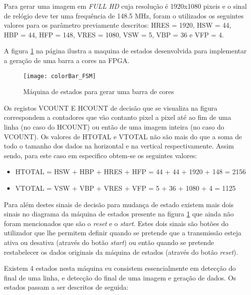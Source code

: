 Para gerar uma imagem em \textit{FULL HD} cuja resolução é 1920x1080 pixeis e o sinal de relógio deve ter uma frequência de 148.5 MHz, foram o utilizados os seguintes valores para os parâmetro previamente descritos: HRES = 1920, HSW = 44, HBP = 44, HFP = 148,  VRES = 1080, VSW = 5, VBP = 36 e VFP = 4.

A figura \ref{fig:colorBar_fsm} na página \pageref{fig:colorBar_fsm} ilustra a maquina de estados desenvolvida para implementar a geração de uma barra a cores na FPGA. 

\begin{figure}[h!]
	\begin{center}
		\leavevmode
		\texttt{[image: colorBar\_FSM]}
		\caption{Máquina de estados para gerar uma barra de cores}
		\label{fig:colorBar_fsm}
	\end{center}
\end{figure}

Os registos VCOUNT E HCOUNT de decisão que se visualiza na figura correspondem a contadores que vão contanto pixel a pixel até ao fim de uma linha (no caso do HCOUNT) ou então de uma imagem inteira (no caso do VCOUNT). Os valores de HTOTAL e VTOTAL não são mais do que a soma de todo o tamanho dos dados na horizontal e na vertical respectivamente. Assim sendo, para este caso em especifico obtem-se os seguintes valores:
\begin{itemize}
	\item HTOTAL = HSW + HBP + HRES + HFP = 44 + 44 + 1920 + 148 = 2156
	\item VTOTAL = VSW + VBP + VRES + VFP = 5 + 36 + 1080 + 4 = 1125
\end{itemize}

Para além destes sinais de decisão para mudança de estado existem mais dois sinais no diagrama da máquina de estados presente na figura \ref{fig:colorBar_fsm} que ainda não foram mencionados que são o \textit{reset} e o \textit{start}. Estes dois sinais são botões do utilizador que lhe permitem definir quando se pretende que a transmissão esteja ativa ou desativa (através do botão \textit{start}) ou então quando se pretende restabelecer os dados originais da máquina de estados (através do botão \textit{reset}). 


Existem 4 estados nesta máquina eu consistem essencialmente em detecção do final de uma linha, e detecção do final de uma imagem e geração de dados. Os estados passam a ser descritos de seguida:

